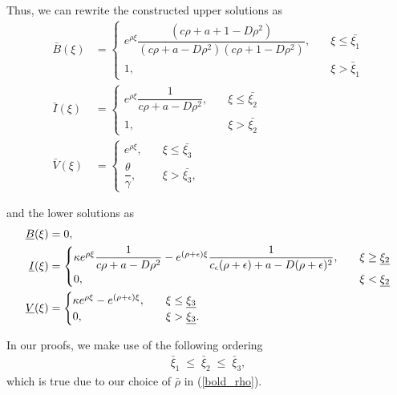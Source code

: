 \documentclass[11pt]{article}
\theoremstyle{definition}
\begin{document}
Thus, we can rewrite the constructed upper solutions as \begin{align}\label{uppersolutions}
     \nonumber \bar{B}(\xi)& =
    \begin{cases}
     e^{\rho \xi} \dfrac{(c \rho+a+1-D \rho^2)}{(c \rho +a- D \rho^2)(c\rho +1- D\rho^2)},& \quad \xi \leq \bar{\xi_1}  \\ 
        1, & \quad \xi > \bar{\xi}_1
    \end{cases} \\\bar{I}(\xi) &=
    \begin{cases}
       e^{\rho \xi}\dfrac{1}{c \rho +a - D \rho^2}, & \quad \xi \leq \bar{\xi_2} \\ 
        1, & \quad \xi > \bar{\xi_2}
    \end{cases}\\ \nonumber\bar{V}(\xi)& =
    \begin{cases}
        e^{\rho \xi}, & \quad \xi \leq\bar{\xi_3} \\ 
         \dfrac{\theta}{\gamma},\, & \quad \xi >\bar{\xi_3},
    \end{cases}
\end{align}


and the lower solutions as
\begin{align}\label{lowersolutions}
  \nonumber  \underline{B}(\xi)& =
   0, \\ \underline{I}(\xi) &=
    \begin{cases}
       \kappa e^{\rho \xi} \dfrac{1}{c \rho +a - D \rho^2}-e^{(\rho+ \epsilon)\xi}\dfrac{1}{c_\epsilon (\rho+\epsilon)+a-D (\rho+\epsilon)^2 },  & \quad \xi \geq \underline{\xi_2} \\ 
        0, & \quad \xi < \underline{\xi_2}
    \end{cases}\\ \notag \underline{V}(\xi)& =
    \begin{cases}
        \kappa e^{\rho \xi}-e^{(\rho+ \epsilon)\xi}, & \quad \xi \leq \underline{\xi_3} \\ 
       0, & \quad \xi >\underline{\xi_3}. 
    \end{cases}
\end{align}

In our proofs, we make use of the following ordering 
\begin{align}
    \bar{\xi}_{1} \;\le\; \bar{\xi}_{2} \;\le\; \bar{\xi}_{3},
\end{align}
which is true due to our choice of $\bar\rho$ in (\ref{bold_rho}). 
\end{document}
